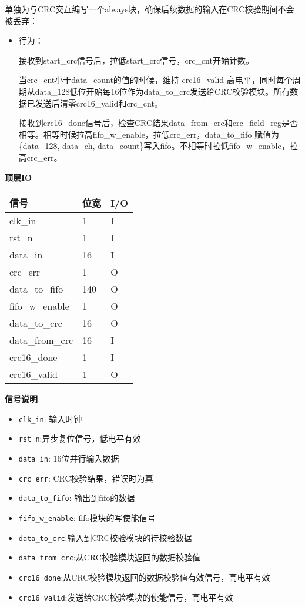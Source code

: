 \documentclass[12pt,]{article}
\providecommand{\tightlist}{%
  \setlength{\itemsep}{0pt}\setlength{\parskip}{0pt}}
\begin{document}
单独为与CRC交互编写一个always块，确保后续数据的输入在CRC校验期间不会被丢弃：

\begin{itemize}
\item
  行为：

  接收到start\_crc信号后，拉低start\_crc信号，crc\_cnt开始计数。

  当crc\_cnt小于data\_count的值的时候，维持 crc16\_valid
  高电平，同时每个周期从data\_128低位开始每16位作为data\_to\_crc发送给CRC校验模块。所有数据已发送后清零crc16\_valid和crc\_cnt。

  接收到crc16\_done信号后，检查CRC结果data\_from\_crc和crc\_field\_reg是否相等。相等时候拉高fifo\_w\_enable，拉低crc\_err，data\_to\_fifo
  赋值为\{data\_128, data\_ch,
  data\_count\}写入fifo。不相等时拉低fifo\_w\_enable，拉高crc\_err。
\end{itemize}

\textbf{顶层IO}

\begin{longtable}[]{@{}lll@{}}
\toprule\noalign{}
信号 & 位宽 & I/O \\
\midrule\noalign{}
\endhead
\bottomrule\noalign{}
\endlastfoot
clk\_in & 1 & I \\
rst\_n & 1 & I \\
data\_in & 16 & I \\
crc\_err & 1 & O \\
data\_to\_fifo & 140 & O \\
fifo\_w\_enable & 1 & O \\
data\_to\_crc & 16 & O \\
data\_from\_crc & 16 & I \\
crc16\_done & 1 & I \\
crc16\_valid & 1 & O \\
\end{longtable}

\textbf{信号说明}

\begin{itemize}
\tightlist
\item
  \texttt{clk\_in}: 输入时钟
\item
  \texttt{rst\_n}:异步复位信号，低电平有效
\item
  \texttt{data\_in}: 16位并行输入数据
\item
  \texttt{crc\_err}: CRC校验结果，错误时为真
\item
  \texttt{data\_to\_fifo}: 输出到fifo的数据
\item
  \texttt{fifo\_w\_enable}: fifo模块的写使能信号
\item
  \texttt{data\_to\_crc}:输入到CRC校验模块的待校验数据
\item
  \texttt{data\_from\_crc}:从CRC校验模块返回的数据校验值
\item
  \texttt{crc16\_done}:从CRC校验模块返回的数据校验值有效信号，高电平有效
\item
  \texttt{crc16\_valid}:发送给CRC校验模块的使能信号，高电平有效
\end{itemize}
\end{document}
